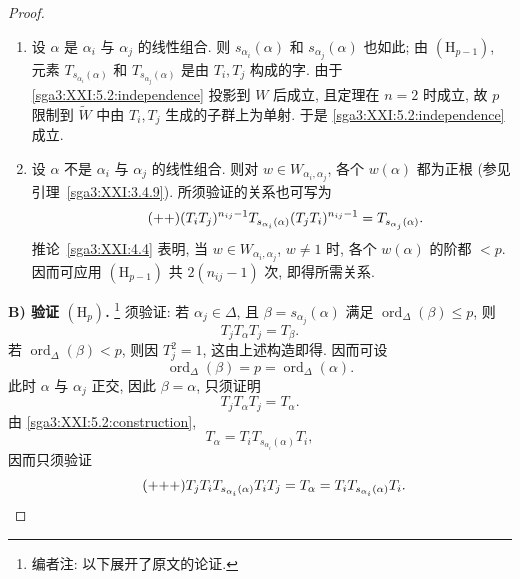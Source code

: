 \begin{proof}
\begin{enumerate}
\item[(1)] 设 \(\alpha\) 是 \(\alpha_i\) 与 \(\alpha_j\) 的线性组合. 则 \(s_{\alpha_i}(\alpha)\) 和 \(s_{\alpha_j}(\alpha)\) 也如此; 由 \((\mathrm{H}_{p-1})\), 元素 \(T_{s_{\alpha_i}(\alpha)}\) 和 \(T_{s_{\alpha_j}(\alpha)}\) 是由 \(T_i,T_j\) 构成的字. 由于 \eqref{sga3:XXI:5.2:independence} 投影到 \(W\) 后成立, 且定理在 \(n=2\) 时成立, 故 \(p\) 限制到 \(\widetilde W\) 中由 \(T_i,T_j\) 生成的子群上为单射. 于是 \eqref{sga3:XXI:5.2:independence} 成立.

\item[(2)] 设 \(\alpha\) 不是 \(\alpha_i\) 与 \(\alpha_j\) 的线性组合. 则对 \(w\in W_{\alpha_i,\alpha_j}\), 各个 \(w(\alpha)\) 都为正根 (参见引理~\ref{sga3:XXI:3.4.9}). 所须验证的关系也可写为
\begin{equation}
\tag{\({+}{+}\)}
\label{sga3:XXI:5.2:rank-two-relation}
 (T_iT_j)^{n_{ij}-1}T_{s_{\alpha_i}(\alpha)}
 (T_jT_i)^{n_{ij}-1}
 =T_{s_{\alpha_j}(\alpha)}.
\end{equation}
推论~\ref{sga3:XXI:4.4} 表明, 当 \(w\in W_{\alpha_i,\alpha_j}\), \(w\ne1\) 时, 各个 \(w(\alpha)\) 的阶都 \(<p\). 因而可应用 \((\mathrm{H}_{p-1})\) 共 \(2(n_{ij}-1)\) 次, 即得所需关系.
\end{enumerate}

\medskip
\noindent\textbf{B) 验证 \((\mathrm{H}_p)\).}
\footnote{编者注: 以下展开了原文的论证.}
须验证: 若 \(\alpha_j\in\Delta\), 且 \(\beta=s_{\alpha_j}(\alpha)\) 满足 \(\operatorname{ord}_\Delta(\beta)\le p\), 则
\[
 T_jT_\alpha T_j=T_\beta.
\]
若 \(\operatorname{ord}_\Delta(\beta)<p\), 则因 \(T_j^2=1\), 这由上述构造即得. 因而可设
\[
 \operatorname{ord}_\Delta(\beta)
 =p=\operatorname{ord}_\Delta(\alpha).
\]
此时 \(\alpha\) 与 \(\alpha_j\) 正交, 因此 \(\beta=\alpha\), 只须证明
\begin{equation}
\tag{\(\dagger\)}
\label{sga3:XXI:5.2:orthogonal}
 T_jT_\alpha T_j=T_\alpha.
\end{equation}
由 \eqref{sga3:XXI:5.2:construction},
\[
 T_\alpha=T_iT_{s_{\alpha_i}(\alpha)}T_i,
\]
因而只须验证
\begin{equation}
\tag{\({+}{+}{+}\)}
\label{sga3:XXI:5.2:orthogonal-expanded}
 T_jT_iT_{s_{\alpha_i}(\alpha)}T_iT_j
 =T_\alpha
 =T_iT_{s_{\alpha_i}(\alpha)}T_i.
\end{equation}
\end{proof}


